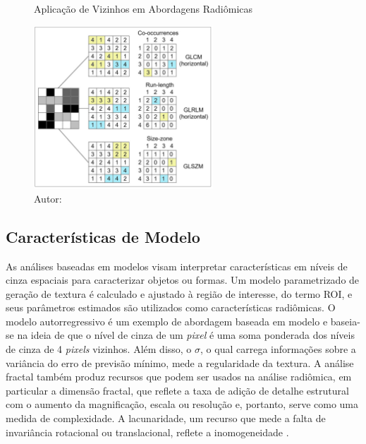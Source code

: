 \begin{figure}[htbp]
    \centering
    \caption{Aplicação de Vizinhos em Abordagens Radiômicas}
    \includegraphics[width=0.6\textwidth]{figures/fig002.png}
    \caption*{Autor: \cite{mayerhoeferIntroductionRadiomics2020}}
    \label{fig:fig002}
\end{figure}

\subsection{Características de Modelo}

As análises baseadas em modelos visam interpretar características em níveis de cinza espaciais para caracterizar objetos ou formas. Um modelo parametrizado de geração de textura é calculado e ajustado à região de interesse, do termo \gls{ROI}, e seus parâmetros estimados são utilizados como características radiômicas. O modelo autorregressivo é um exemplo de abordagem baseada em modelo e baseia-se na ideia de que o nível de cinza de um \textit{pixel} é uma soma ponderada dos níveis de cinza de 4 \textit{pixels} vizinhos. Além disso, o $\sigma$, o qual carrega informações sobre a variância do erro de previsão mínimo, mede a regularidade da textura. A análise fractal também produz recursos que podem ser usados na análise radiômica, em particular a dimensão fractal, que reflete a taxa de adição de detalhe estrutural com o aumento da magnificação, escala ou resolução e, portanto, serve como uma medida de complexidade. A lacunaridade, um recurso que mede a falta de invariância rotacional ou translacional, reflete a inomogeneidade \cite{mayerhoeferIntroductionRadiomics2020}.

